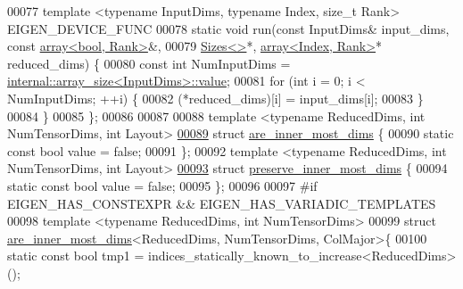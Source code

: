 \begin{DoxyCode}
00077   \textcolor{keyword}{template} <\textcolor{keyword}{typename} InputDims, \textcolor{keyword}{typename} Index, \textcolor{keywordtype}{size\_t} Rank> EIGEN\_DEVICE\_FUNC
00078   \textcolor{keyword}{static} \textcolor{keywordtype}{void} run(\textcolor{keyword}{const} InputDims& input\_dims, \textcolor{keyword}{const} \hyperlink{class_eigen_1_1array}{array<bool, Rank>}&,
00079                   \hyperlink{struct_eigen_1_1_sizes}{Sizes<>}*, \hyperlink{class_eigen_1_1array}{array<Index, Rank>}* reduced\_dims) \{
00080     \textcolor{keyword}{const} \textcolor{keywordtype}{int} NumInputDims = \hyperlink{struct_eigen_1_1internal_1_1array__size}{internal::array\_size<InputDims>::value};
00081     \textcolor{keywordflow}{for} (\textcolor{keywordtype}{int} i = 0; i < NumInputDims; ++i) \{
00082       (*reduced\_dims)[i] = input\_dims[i];
00083     \}
00084   \}
00085 \};
00086 
00087 
00088 \textcolor{keyword}{template} <\textcolor{keyword}{typename} ReducedDims, \textcolor{keywordtype}{int} NumTensorDims, \textcolor{keywordtype}{int} Layout>
\hyperlink{struct_eigen_1_1internal_1_1are__inner__most__dims}{00089} \textcolor{keyword}{struct }\hyperlink{struct_eigen_1_1internal_1_1are__inner__most__dims}{are\_inner\_most\_dims} \{
00090   \textcolor{keyword}{static} \textcolor{keyword}{const} \textcolor{keywordtype}{bool} value = \textcolor{keyword}{false};
00091 \};
00092 \textcolor{keyword}{template} <\textcolor{keyword}{typename} ReducedDims, \textcolor{keywordtype}{int} NumTensorDims, \textcolor{keywordtype}{int} Layout>
\hyperlink{struct_eigen_1_1internal_1_1preserve__inner__most__dims}{00093} \textcolor{keyword}{struct }\hyperlink{struct_eigen_1_1internal_1_1preserve__inner__most__dims}{preserve\_inner\_most\_dims} \{
00094   \textcolor{keyword}{static} \textcolor{keyword}{const} \textcolor{keywordtype}{bool} value = \textcolor{keyword}{false};
00095 \};
00096 
00097 \textcolor{preprocessor}{#if EIGEN\_HAS\_CONSTEXPR && EIGEN\_HAS\_VARIADIC\_TEMPLATES}
00098 \textcolor{keyword}{template} <\textcolor{keyword}{typename} ReducedDims, \textcolor{keywordtype}{int} NumTensorDims>
00099 \textcolor{keyword}{struct }\hyperlink{struct_eigen_1_1internal_1_1are__inner__most__dims}{are\_inner\_most\_dims}<ReducedDims, NumTensorDims, ColMajor>\{
00100   \textcolor{keyword}{static} \textcolor{keyword}{const} \textcolor{keywordtype}{bool} tmp1 = indices\_statically\_known\_to\_increase<ReducedDims>();

\end{DoxyCode}
